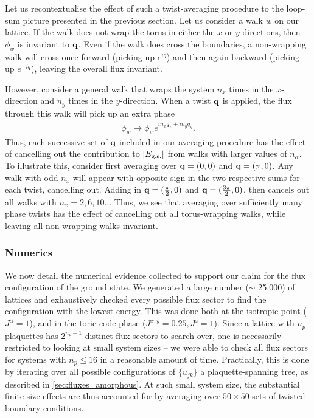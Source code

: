 Let us recontextualise the effect of such a twist-averaging procedure to the loop-sum picture presented in the previous section. Let us consider a walk $w$ on our lattice. If the walk does not wrap the torus in either the $x$ or $y$ directions, then $\phi_w$ is invariant to $\textbf q$. Even if the walk does cross the boundaries, a non-wrapping walk will cross once forward (picking up $e^{iq}$) and then again backward (picking up $e^{-iq}$), leaving the overall flux invariant. 

However, consider a general walk that wraps the system $n_x$ times in the $x$-direction and $n_y$ times in the $y$-direction. When a twist $\textbf q$ is applied, the flux through this walk will pick up an extra phase
\begin{align}
    \phi_w \rightarrow \phi_w 
    e^{in_x q_x+in_y q_y}.
\end{align}
Thus, each successive set of $\textbf q$ included in our averaging procedure has the effect of cancelling out the contribution to $|E_\textup{g.s.}|$ from walks with larger values of $n_\alpha$. To illustrate this, consider first averaging over $\textbf q = (0,0)$ and $\textbf q = (\pi,0)$. Any walk with odd $n_x$ will appear with opposite sign in the two respective sums for each twist, cancelling out. Adding in $\textbf q = (\frac{\pi}2,0)$ and $\textbf q = (\frac{3\pi}2,0)$, then cancels out all walks with $n_x = 2,6,10...$ Thus, we see that averaging over sufficiently many phase twists has the effect of cancelling out all torus-wrapping walks, while leaving all non-wrapping walks invariant. 

\subsubsection{Numerics}
We now detail the numerical evidence collected to support our claim for the flux configuration of the ground state. We generated a large number ($\sim$ 25,000) of lattices and exhaustively checked every possible flux sector to find the configuration with the lowest energy. This was done both at the isotropic point ($J^\alpha = 1$), and in the toric code phase ($J^{x,y} = 0.25, J^z = 1$). Since a lattice with $n_p$ plaquettes has $2^{n_p - 1}$ distinct flux sectors to search over, one is necessarily restricted to looking at small system sizes -- we were able to check all flux sectors for systems with $n_p \leq 16$ in a reasonable amount of time. Practically, this is done by iterating over all possible configurations of $\{u_{jk}\}$ a plaquette-spanning tree, as described in \textsection\ref{sec:fluxes_amorphous}. At such small system size, the substantial finite size effects are thus accounted for by averaging over $50\times50$ sets of twisted boundary conditions.

